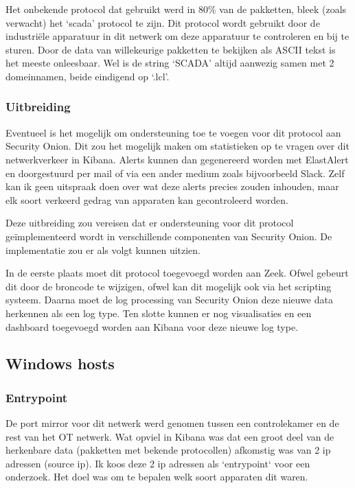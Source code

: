\documentclass[a4paper, 12pt]{report}
\begin{document}
Het onbekende protocol dat gebruikt werd in $80\%$ van de pakketten, bleek (zoals verwacht) het `scada' protocol te zijn.
Dit protocol wordt gebruikt door de industriële apparatuur in dit netwerk om deze apparatuur te controleren en bij te sturen.
Door de data van willekeurige pakketten te bekijken als ASCII tekst is het meeste onleesbaar.
Wel is de string `SCADA' altijd aanwezig samen met 2 domeinnamen, beide eindigend op `.lcl'.

\subsubsection{Uitbreiding}
Eventueel is het mogelijk om ondersteuning toe te voegen voor dit protocol aan Security Onion.
Dit zou het mogelijk maken om statistieken op te vragen over dit netwerkverkeer in Kibana.
Alerts kunnen dan gegenereerd worden met ElastAlert en doorgestuurd per mail of via een ander medium zoals bijvoorbeeld Slack.
Zelf kan ik geen uitspraak doen over wat deze alerts precies zouden inhouden, maar elk soort verkeerd gedrag van apparaten kan gecontroleerd worden.

Deze uitbreiding zou vereisen dat er ondersteuning voor dit protocol geïmplementeerd wordt in verschillende componenten van Security Onion.
De implementatie zou er als volgt kunnen uitzien.

In de eerste plaats moet dit protocol toegevoegd worden aan Zeek.
Ofwel gebeurt dit door de broncode te wijzigen, ofwel kan dit mogelijk ook via het scripting systeem.
Daarna moet de log processing van Security Onion deze nieuwe data herkennen als een log type.
Ten slotte kunnen er nog visualisaties en een dashboard toegevoegd worden aan Kibana voor deze nieuwe log type.

\subsection{Windows hosts}
\subsubsection{Entrypoint}
De port mirror voor dit netwerk werd genomen tussen een controlekamer en de rest van het OT netwerk.
Wat opviel in Kibana was dat een groot deel van de herkenbare data (pakketten met bekende protocollen) afkomstig was van 2 ip adressen (source ip).
Ik koos deze 2 ip adressen als `entrypoint` voor een onderzoek.
Het doel was om te bepalen welk soort apparaten dit waren.
\end{document}
